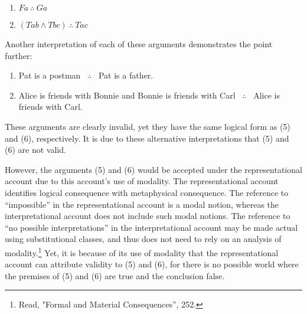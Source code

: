 \begin{enumerate}[leftmargin=42pt] 
\def\labelenumi{(\arabic{enumi})}
\setcounter{enumi}{6}
\item
  $Fa \ \therefore \ Ga$ 
\item 
  $ (Tab \land Tbc) \ \therefore \ Tac $
\end{enumerate}

\noindent Another interpretation of each of these arguments demonstrates the point further:

\begin{enumerate}[leftmargin=42pt] 
\def\labelenumi{(\arabic{enumi})}
\setcounter{enumi}{8}
\item
  Pat is a postman \ $\therefore$ \ Pat is a father.
\item 
  Alice is friends with Bonnie and Bonnie is friends with Carl \ $\therefore$ \ Alice is friends with Carl.
\end{enumerate}

\noindent These arguments are clearly invalid, yet they have the same logical form
as (5) and (6), respectively. It is due to these alternative
interpretations that (5) and (6) are not valid.

However, the arguments (5) and (6) would be accepted under the
representational account due to this account's use of modality. The
representational account identifies logical consequence with
metaphysical consequence. The reference to ``impossible'' in the
representational account is a modal notion, whereas the interpretational
account does not include such modal notions. The reference to ``no
possible interpretations'' in the interpretational account may be made
actual using substitutional classes, and thus does not need to rely on
an analysis of modality.\footnote{Read, "Formal and Material
  Consequences'', 252.} Yet, it is because of its use of modality that
the representational account can attribute validity to (5) and (6), for
there is no possible world where the premises of (5) and (6) are true
and the conclusion false.

